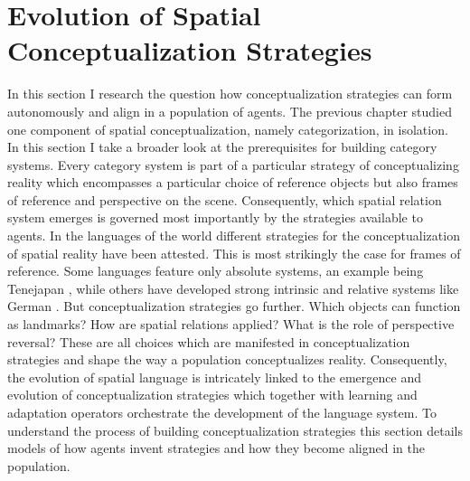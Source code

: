 %

\chapter{Evolution of Spatial Conceptualization Strategies}
\label{s:strategies}
In this section I research the question how conceptualization strategies
can form autonomously and align in a population of agents. The previous
chapter studied one component of spatial conceptualization,
namely categorization, in isolation. In this section I take a broader look at  
the prerequisites for building category systems. Every category system
is part of a particular strategy of conceptualizing reality which encompasses
a particular choice of reference objects but also frames of reference and
perspective on the scene. Consequently, which spatial relation system
emerges is governed most importantly by the strategies available to agents.
In the languages of the world different strategies for the 
conceptualization of spatial reality have been attested. This is most strikingly the case 
for frames of reference. Some languages feature only absolute systems, an example being
Tenejapan \citep{levinson2003space}, while others have developed strong intrinsic and 
relative systems like German \citep{tenbrink2007space}.
But conceptualization strategies go further. Which objects can function as landmarks?
How are spatial relations applied? What is the role of perspective reversal? 
These are all choices which are manifested in conceptualization strategies and shape
the way a population conceptualizes reality.
Consequently, the evolution of spatial language is intricately linked to the 
emergence and evolution of conceptualization strategies which together
with learning and adaptation operators orchestrate the development of the language system.
To understand the process of building conceptualization strategies this section 
details models of how agents invent strategies and how
they become aligned in the population.

